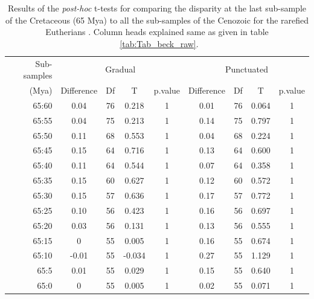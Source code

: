 \documentclass[12pt,letterpaper]{article}
\begin{document}
\begin{table}[ht]
\caption{Results of the \textit{post-hoc} t-tests for comparing the disparity at the last sub-sample of the Cretaceous (65 Mya) to all the sub-samples of the Cenozoic for the rarefied Eutherians \citep[data from][]{beckancient2014}. Column heads explained same as given in table ~\ref{tab:Tab_beck_raw}.}
\label{tab:Tab_beck_rar}
\centering
\begin{tabular}{r|cccc|cccc}
  \hline
  Sub-samples & \multicolumn{4}{c|}{Gradual} & \multicolumn{4}{c}{Punctuated} \\
  (Mya) & Difference & Df & T & p.value & Difference & Df & T & p.value \\ 
  \hline
  65:60 & 0.04  & 76 & 0.218  & 1 & 0.01 & 76 & 0.064 & 1 \\ 
  65:55 & 0.04  & 75 & 0.213  & 1 & 0.14 & 75 & 0.797 & 1 \\ 
  65:50 & 0.11  & 68 & 0.553  & 1 & 0.04 & 68 & 0.224 & 1 \\ 
  65:45 & 0.15  & 64 & 0.716  & 1 & 0.13 & 64 & 0.600 & 1 \\ 
  65:40 & 0.11  & 64 & 0.544  & 1 & 0.07 & 64 & 0.358 & 1 \\ 
  65:35 & 0.15  & 60 & 0.627  & 1 & 0.12 & 60 & 0.572 & 1 \\ 
  65:30 & 0.15  & 57 & 0.636  & 1 & 0.17 & 57 & 0.772 & 1 \\ 
  65:25 & 0.10  & 56 & 0.423  & 1 & 0.16 & 56 & 0.697 & 1 \\ 
  65:20 & 0.03  & 56 & 0.131  & 1 & 0.13 & 56 & 0.555 & 1 \\ 
  65:15 & 0     & 55 & 0.005  & 1 & 0.16 & 55 & 0.674 & 1 \\ 
  65:10 & -0.01 & 55 & -0.034 & 1 & 0.27 & 55 & 1.129 & 1 \\ 
  65:5  & 0.01  & 55 & 0.029  & 1 & 0.15 & 55 & 0.640 & 1 \\ 
  65:0  & 0     & 55 & 0.005  & 1 & 0.02 & 55 & 0.071 & 1 \\
   \hline
\end{tabular}
\end{table}
\end{document}
